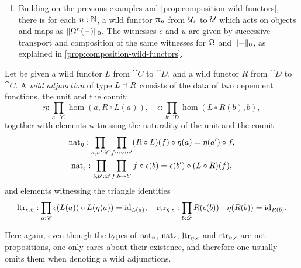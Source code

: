 \documentclass[english,a4paper]{lmcs}
\begin{document}
\begin{exa}
\begin{enumerate}
    \item Building on the previous examples and
      \cref{prop:composition-wild-functors}, there is for each $n:\mathbb{N}$, a wild
      functor $\uppi_{n}$ from $\mathcal{U}_*$ to $\mathcal{U}$ which acts on objects and maps as
      $\lVert\mathop{\Omega^{n}} (\mathord{{-}})\rVert_0$. The witnesses $c$ and $u$ are given
      by successive transport and composition of the same witnesses for
      $\loopspace\null$ and $\lVert\mathord{{-}}\rVert_0$,
      as explained in \cref{prop:composition-wild-functors}.
  \end{enumerate}
\end{exa}

\begin{defi}
  Let be given a wild functor $L$ from $\cat C$ to $\cat D$, and a wild functor
  $R$ from $\cat D$ to $\cat C$. A \emph{wild adjunction} of type $L\dashv
  R$ consists of the data of two dependent functions, the unit and the counit:
  \begin{displaymath}
    \eta : \prod_{a:\cat C} \hom(a,R \circ L(a)), \quad
    \epsilon : \prod_{b:\cat D} \hom(L\circ R (b), b),
  \end{displaymath}
  together with elements witnessing the naturality of the unit and the counit
  \begin{gather*}
    \nat_\eta : \prod_{a,a':\cat C} \prod_{f:\hom(a,a')} (R\circ L)(f) \circ \eta(a) = \eta(a') \circ f, \\
    \nat_\epsilon : \prod_{b,b':\cat D} \prod_{f:\hom(b,b')} f \circ \epsilon(b) = \epsilon(b') \circ (L\circ R)(f),
  \end{gather*}
  and elements witnessing the triangle identities
  \begin{displaymath}
    \mathord{\mathrm{ltr}}_{\epsilon,\eta} : \prod_{a:\mathscr{C}} \epsilon(L(a)) \circ L(\eta(a)) = \mathord{\mathrm{id}}_{L(a)}, \quad
    \mathord{\mathrm{rtr}}_{\eta,\epsilon} : \prod_{b:\mathscr{D}} R(\epsilon(b)) \circ \eta(R(b)) = \mathord{\mathrm{id}}_{R(b)}.
  \end{displaymath}
\end{defi}
Here again, even though the types of $\mathord{\mathrm{nat}}_\eta$,
$\mathord{\mathrm{nat}}_\epsilon$, $\mathord{\mathrm{ltr}}_{\eta,\epsilon}$ and
$\mathord{\mathrm{rtr}}_{\eta,\epsilon}$ are not propositions, one only cares about their
existence, and therefore one usually omits them when denoting a wild
adjunctions.
\end{document}
